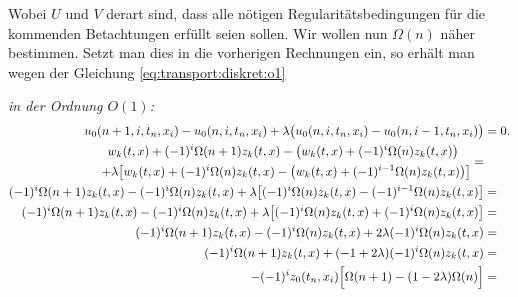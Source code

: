 Wobei $U$ und $V$ derart sind, dass alle nötigen Regularitätsbedingungen für die kommenden Betachtungen erfüllt seien sollen.
Wir wollen nun $\Omega(n)$ näher bestimmen.
Setzt man dies in die vorherigen Rechnungen ein, so erhält man wegen der Gleichung \eqref{eq:transport:diskret:o1}

\noindent \emph{in der Ordnung $O(1)$:}
{\small \begin{align}\label{eq:transport:osz:o1} 
u_0(n+1, i, t_n, x_i) - u_0(n, i, t_n, x_i) + \lambda \bigl(u_0(n, i, t_n, x_i) - u_0(n, i-1, t_n, x_i) \bigr) &= 0. \nonumber\\
\begin{split}
w_k(t, x) + (-1)^i \Omega(n+1) z_k(t, x) - \bigl( w_k(t, x) + (-1)^i \Omega(n) z_k(t, x) \bigr) \quad &\nonumber\\
+ \lambda \bigl[ w_k(t, x) + (-1)^i \Omega(n) z_k(t, x) - \bigl( w_k(t, x) + (-1)^{i-1} \Omega(n) z_k(t, x) \bigr) \bigr]&
\end{split} = \nonumber\\
(-1)^i \Omega(n+1) z_k(t, x) - (-1)^i \Omega(n) z_k(t, x) + \lambda \bigl[ (-1)^i \Omega(n) z_k(t, x) - (-1)^{i-1} \Omega(n) z_k(t, x) \bigr] & =\nonumber\\
(-1)^i \Omega(n+1) z_k(t, x) - (-1)^i \Omega(n) z_k(t, x) + \lambda \bigl[ (-1)^i \Omega(n) z_k(t, x) + (-1)^{i} \Omega(n) z_k(t, x) \bigr] & =\nonumber\\
(-1)^i \Omega(n+1) z_k(t, x) - (-1)^i \Omega(n) z_k(t, x) + 2 \lambda (-1)^i \Omega(n) z_k(t, x) & =\nonumber\\
(-1)^i \Omega(n+1) z_k(t, x) + (-1 + 2\lambda) (-1)^i \Omega(n) z_k(t, x) & =\nonumber\\
- (-1)^i z_0(t_n, x_i) \Bigl[ \Omega(n+1) - ( 1 - 2 \lambda ) \Omega(n) \Bigr] & =
\end{align} }

